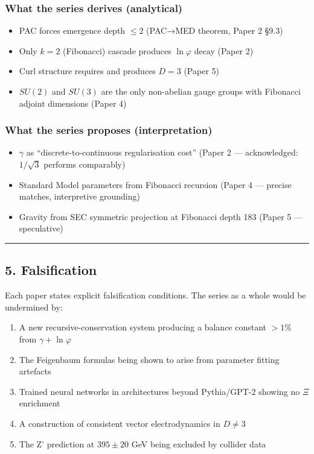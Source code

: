 \documentclass[
  11pt,
  a4paper]{article}
\providecommand{\tightlist}{%
  \setlength{\itemsep}{0pt}\setlength{\parskip}{0pt}}
\begin{document}
\subsubsection{What the series derives
(analytical)}\label{what-the-series-derives-analytical}

\begin{itemize}
\tightlist
\item
  PAC forces emergence depth \(\leq 2\) (PAC→MED theorem, Paper 2 §9.3)
\item
  Only \(k = 2\) (Fibonacci) cascade produces \(\ln\varphi\) decay
  (Paper 2)
\item
  Curl structure requires and produces \(D = 3\) (Paper 5)
\item
  \(SU(2)\) and \(SU(3)\) are the only non-abelian gauge groups with
  Fibonacci adjoint dimensions (Paper 4)
\end{itemize}

\subsubsection{What the series proposes
(interpretation)}\label{what-the-series-proposes-interpretation}

\begin{itemize}
\tightlist
\item
  \(\gamma\) as ``discrete-to-continuous regularisation cost'' (Paper 2
  --- acknowledged: \(1/\sqrt{3}\) performs comparably)
\item
  Standard Model parameters from Fibonacci recursion (Paper 4 ---
  precise matches, interpretive grounding)
\item
  Gravity from SEC symmetric projection at Fibonacci depth 183 (Paper 5
  --- speculative)
\end{itemize}

\begin{center}\rule{0.5\linewidth}{0.5pt}\end{center}

\subsection{5. Falsification}\label{falsification}

Each paper states explicit falsification conditions. The series as a
whole would be undermined by:

\begin{enumerate}
\def\labelenumi{\arabic{enumi}.}
\tightlist
\item
  A new recursive-conservation system producing a balance constant
  \(> 1\%\) from \(\gamma + \ln\varphi\)
\item
  The Feigenbaum formulas being shown to arise from parameter fitting
  artefacts
\item
  Trained neural networks in architectures beyond Pythia/GPT-2 showing
  no \(\Xi\) enrichment
\item
  A construction of consistent vector electrodynamics in \(D \neq 3\)
\item
  The Z' prediction at \(395 \pm 20\) GeV being excluded by collider
  data
\end{enumerate}
\end{document}
